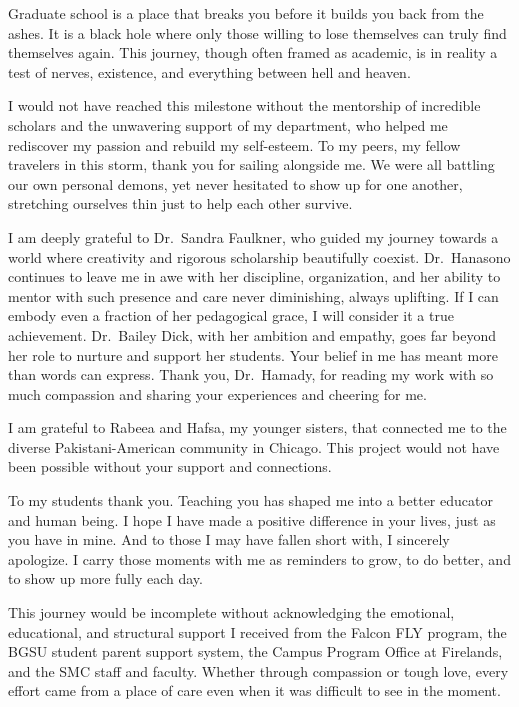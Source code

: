 Graduate school is a place that breaks you before it builds you back from the ashes. It is a black hole where only those willing to lose themselves can truly find themselves again. This journey, though often framed as academic, is in reality a test of nerves, existence, and everything between hell and heaven. 

I would not have reached this milestone without the mentorship of incredible scholars and the unwavering support of my department, who helped me rediscover my passion and rebuild my self-esteem. To my peers, my fellow travelers in this storm, thank you for sailing alongside me. We were all battling our own personal demons, yet never hesitated to show up for one another, stretching ourselves thin just to help each other survive. 

I am deeply grateful to Dr.~Sandra Faulkner, who guided my journey towards a world where creativity and rigorous scholarship beautifully coexist. Dr.~Hanasono continues to leave me in awe with her discipline, organization, and her ability to mentor with such presence and care never diminishing, always uplifting. If I can embody even a fraction of her pedagogical grace, I will consider it a true achievement. Dr.~Bailey Dick, with her ambition and empathy, goes far beyond her role to nurture and support her students. Your belief in me has meant more than words can express. Thank you, Dr.~Hamady, for reading my work with so much compassion and sharing your experiences and cheering for me. 

I am grateful to Rabeea and Hafsa, my younger sisters, that connected me to the diverse Pakistani-American community in Chicago. This project would not have been possible without your support and connections.

To my students thank you. Teaching you has shaped me into a better educator and human being. I hope I have made a positive difference in your lives, just as you have in mine. And to those I may have fallen short with, I sincerely apologize. I carry those moments with me as reminders to grow, to do better, and to show up more fully each day. 

This journey would be incomplete without acknowledging the emotional, educational, and structural support I received from the Falcon FLY program, the BGSU student parent support system, the Campus Program Office at Firelands, and the SMC staff and faculty. Whether through compassion or tough love, every effort came from a place of care even when it was difficult to see in the moment. 

